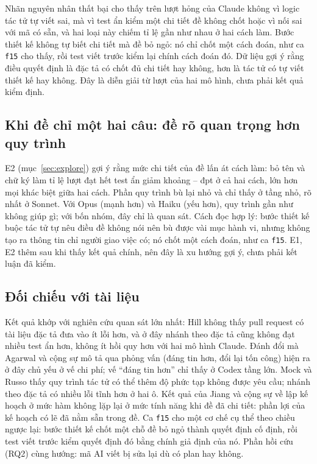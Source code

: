 Nhãn nguyên nhân thất bại cho thấy \NumLabOutside{} trên \NumLabRuns{} lượt hỏng của Claude không vì logic
tác tử tự viết sai, mà vì test ẩn kiểm một chi tiết đề không chốt hoặc vì nối sai với mã có sẵn, và hai
loại này chiếm tỉ lệ gần như nhau ở hai cách làm. Bước thiết kế không tự biết chi tiết mà đề bỏ ngỏ: nó chỉ
chốt một cách đoán, như ca \texttt{f15} cho thấy, rồi test viết trước kiểm lại chính cách đoán đó. Dữ liệu
gợi ý rằng điều quyết định là đặc tả có chốt đủ chi tiết hay không, hơn là tác tử có tự viết thiết kế hay
không. Đây là diễn giải từ \NumLabRuns{} lượt của hai mô hình, chưa phải kết quả kiểm định.

\subsection{Khi đề chỉ một hai câu: đề rõ quan trọng hơn quy trình}

E2 (mục~\ref{sec:explore}) gợi ý rằng mức chi tiết của đề lấn át cách làm: bỏ tên và chữ ký làm tỉ lệ lượt
đạt hết test ẩn giảm khoảng \NumETwoXPassShiftSpec{}--\NumETwoXPassShiftVibe{} đpt ở cả hai cách, lớn hơn
mọi khác biệt giữa hai cách. Phần quy trình bù lại nhỏ và chỉ thấy ở tầng nhỏ, rõ nhất
ở Sonnet. Với Opus (mạnh hơn) và Haiku (yếu hơn), quy trình gần như không giúp gì; với bốn nhóm, đây chỉ là quan sát. Cách đọc
hợp lý: bước thiết kế buộc tác tử tự nêu điều đề không nói nên bù được vài mục hành vi, nhưng không tạo ra
thông tin chỉ người giao việc có; nó chốt một cách đoán, như ca \texttt{f15}. E1, E2 thêm sau khi thấy kết
quả chính, nên đây là xu hướng gợi ý, chưa phải kết luận đã kiểm.

\subsection{Đối chiếu với tài liệu}

Kết quả khớp với nghiên cứu quan sát lớn nhất: Hill \cite{hill_2026} không thấy pull request có tài liệu
đặc tả đưa vào ít lỗi hơn, và ở đây nhánh theo đặc tả cũng không đạt nhiều test ẩn hơn, không ít hồi quy
hơn với hai mô hình Claude. Đánh đổi mà Agarwal và cộng sự \cite{agarwal_2026} mô tả qua phỏng vấn (đáng
tin hơn, đổi lại tốn công) hiện ra ở đây chủ yếu ở vế chi phí; vế ``đáng tin hơn'' chỉ thấy ở Codex tầng
lớn. Mock và Russo \cite{mock_2026} thấy quy trình tác tử có thể thêm độ phức tạp không được yêu cầu;
nhánh theo đặc tả có nhiều lỗi tĩnh hơn ở hai ô. Kết quả của Jiang và cộng
sự \cite{jiang_2024} về lập kế hoạch ở mức hàm không lặp lại ở mức tính năng khi đề đã chi tiết: phần lợi
của kế hoạch có lẽ đã nằm sẵn trong đề. Ca \texttt{f15} cho một cơ chế cụ thể theo chiều ngược
lại: bước thiết kế chốt một chỗ đề bỏ ngỏ thành quyết định cố định, rồi test viết trước kiểm quyết định đó
bằng chính giả định của nó. Phần hồi cứu (RQ2) cùng hướng: mã AI viết bị sửa lại dù có plan hay không.

